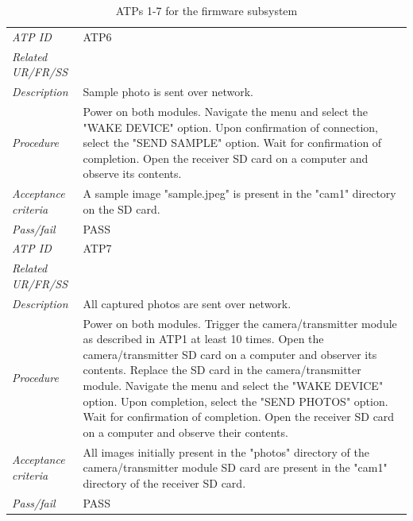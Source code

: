 \begin{table}[!ht]
\begin{scriptsize}
\begin{tabularx}{\textwidth}{|p{} X|}
        \textit{ATP ID} & ATP6\\
        \textit{Related UR/FR/SS} & \\
        \textit{Description} & Sample photo is sent over network.\\
        \textit{Procedure} & Power on both modules. Navigate the menu and select the "WAKE DEVICE" option. Upon confirmation of connection, select the "SEND SAMPLE" option. Wait for confirmation of completion. Open the receiver SD card on a computer and observe its contents.\\
        \textit{Acceptance criteria} & A sample image "sample.jpeg" is present in the "cam1" directory on the SD card. \\ 
        \textit{Pass/fail} & PASS \\ \hline

        \textit{ATP ID} & ATP7 \\
        \textit{Related UR/FR/SS} & \\
        \textit{Description} & All captured photos are sent over network.\\
        \textit{Procedure} & Power on both modules. Trigger the camera/transmitter module as described in ATP1 at least 10 times. Open the camera/transmitter SD card on a computer and observer its contents. Replace the SD card in the camera/transmitter module. Navigate the menu and select the "WAKE DEVICE" option. Upon completion, select the "SEND PHOTOS" option. Wait for confirmation of completion. Open the receiver SD card on a computer and observe their contents.\\
        \textit{Acceptance criteria} & All images initially present in the "photos" directory of the camera/transmitter module SD card are present in the "cam1" directory of the receiver SD card.\\ 
        \textit{Pass/fail} & PASS \\ \hline
        

    \end{tabularx}
    \end{scriptsize}
    \caption{ATPs 1-7 for the firmware subsystem}
    \label{tab:firmware-atps1}
\end{table}

